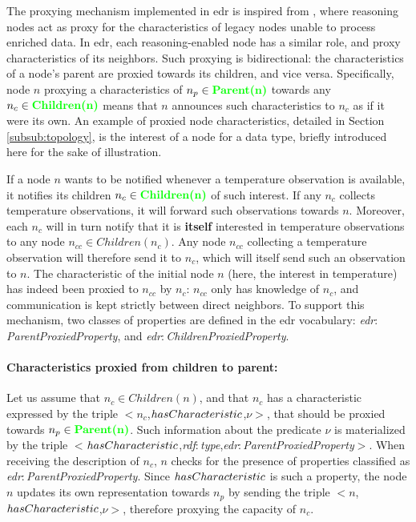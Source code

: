 \documentclass{iosart2c}
\newcommand{\added}[1]{\textcolor{green}{\textbf{#1}}}
\newcommand{\namespace}[1]{\textit{#1$:$}}
\newcommand{\concept}[2]{\namespace{#1}\-\textit{#2}}
\newcommand{\triplet}[3]{$<$#1,\textit{#2},#3$>$}
\begin{document}
The proxying mechanism implemented in \gls{edr} is inspired from \cite{Nikoli2011}, where reasoning nodes act as proxy for the characteristics of legacy nodes unable to process enriched data. 
In \gls{edr}, each reasoning-enabled node has a similar role, and proxy characteristics of its neighbors. 
Such proxying is bidirectional: the characteristics of a node's parent are proxied towards its children, and vice versa.
Specifically, node $n$ proxying a characteristics of $n_{p}\in \added{Parent(n)}$ towards any $n_{c}\in \added{Children(n)}$ means that $n$ announces such characteristics to $n_{c}$ as if it were its own.
An example of proxied node characteristics, detailed in Section \textsection \ref{subsub:topology}, is the interest of a node for a data type, briefly introduced here for the sake of illustration.

If a node $n$ wants to be notified whenever a temperature observation is available, it notifies its children $n_{c}\in \added{Children(n)}$ of such interest. 
If any $n_{c}$ collects temperature observations, it will forward such observations towards $n$. 
Moreover, each $n_{c}$ will in turn notify that it is \textbf{itself} interested in temperature observations to any node $n_{cc}\in Children(n_c)$.
Any node $n_{cc}$ collecting a temperature observation will therefore send it to $n_{c}$, which will itself send such an observation to $n$.
The characteristic of the initial node $n$ (here, the interest in temperature) has indeed been proxied to $n_{cc}$ by $n_{c}$: $n_{cc}$ only has knowledge of $n_{c}$, and communication is kept strictly between direct neighbors.
To support this mechanism, two classes of properties are defined in the \gls{edr} vocabulary: \concept{edr}{Parent\-Proxied\-Property}, and \concept{edr}{Children\-Proxied\-Property}.

\paragraph{Characteristics proxied from children to parent:}
Let us assume that $n_{c}\in Children(n)$, and that $n_{c}$ has a characteristic expressed by the triple \triplet{$n_{c}$}{$has\-Cha\-racteri\-stic$}{$\nu$}, that should be proxied towards $n_{p}\in \added{Parent(n)}$.
Such information about the predicate $\nu$ is materialized by the triple \triplet{$has\-Characteri\-stic$}{\concept{rdf}{type}}{\concept{edr}{Parent\-Proxied\-Property}}.
When receiving the description of $n_{c}$, $n$ checks for the presence of properties classified as \concept{edr}{Parent\-Proxied\-Property}. 
Since $has\-Characteristic$ is such a property, the node $n$ updates its own representation towards $n_p$ by sending the triple \triplet{$n$}{$has\-Characteri\-stic$}{$\nu$}, therefore proxying the capacity of $n_{c}$.
\end{document}
